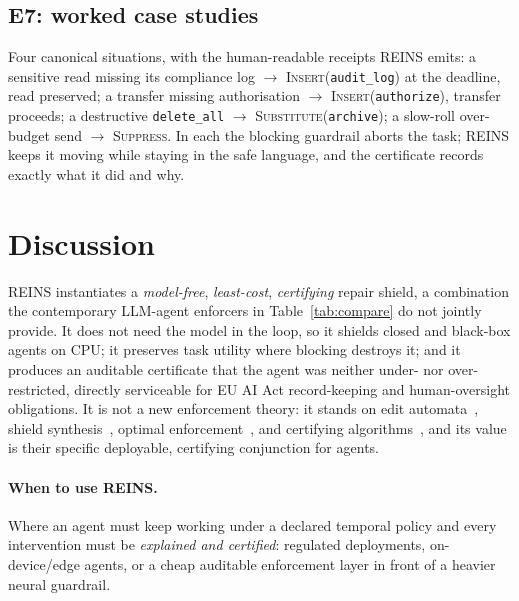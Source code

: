 \documentclass[11pt]{article}
\begin{document}
\subsection{E7: worked case studies}
Four canonical situations, with the human-readable receipts REINS emits:
a sensitive read missing its compliance log $\to$
\textsc{Insert}(\texttt{audit\_log}) at the deadline, read preserved;
a transfer missing authorisation $\to$ \textsc{Insert}(\texttt{authorize}),
transfer proceeds; a destructive \texttt{delete\_all} $\to$
\textsc{Substitute}(\texttt{archive}); a slow-roll over-budget send $\to$
\textsc{Suppress}. In each the blocking guardrail aborts the task; REINS keeps it
moving while staying in the safe language, and the certificate records exactly
what it did and why.

\section{Discussion}
REINS instantiates a \emph{model-free}, \emph{least-cost}, \emph{certifying} repair
shield, a combination the contemporary LLM-agent enforcers in
Table~\ref{tab:compare} do not jointly provide. It does not
need the model in the loop, so it shields closed and black-box agents on CPU; it
preserves task utility where blocking destroys it; and it produces an auditable
certificate that the agent was neither under- nor over-restricted, directly
serviceable for EU AI Act record-keeping and human-oversight obligations. It is
not a new enforcement theory: it stands on edit
automata~\citep{ligatti2005edit}, shield
synthesis~\citep{bloem2015shield,alshiekh2018safe}, optimal
enforcement~\citep{pandya2019optimal,gallay2021decentralized}, and certifying
algorithms~\citep{mcconnell2011certifying}, and its value is their specific
deployable, certifying conjunction for agents.

\paragraph{When to use REINS.} Where an agent must keep working under a declared
temporal policy and every intervention must be \emph{explained and certified}:
regulated deployments, on-device/edge agents, or a cheap auditable enforcement
layer in front of a heavier neural guardrail.
\end{document}
